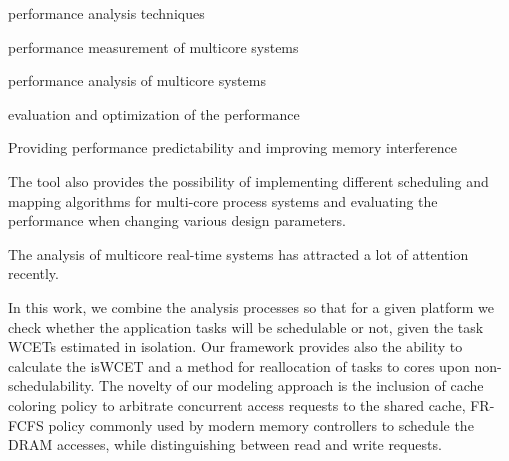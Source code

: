 \label{sec:relatedwork}

\cite{10.1109/MS.2005.102} performance analysis techniques 

\cite{Rakhee2014} performance measurement of multicore systems

\cite{DBLP:journals/corr/TeodoroKAKFS15} performance analysis of multicore systems

\cite{5762713} evaluation and optimization of the performance

\cite{Subramanian13} Providing performance predictability and improving memory interference 

\cite{SHARMA2014544} The tool also provides the possibility of implementing different scheduling and mapping algorithms for multi-core process systems and evaluating the performance when changing various design parameters.



The analysis of multicore real-time systems has attracted a lot of attention recently. 

In this work, we combine the analysis processes so that for a given platform we check whether the application tasks will be schedulable or not, given the task WCETs estimated in isolation. Our framework provides also the ability to calculate the isWCET and a method for reallocation of tasks to cores upon non-schedulability. 
The novelty of our modeling approach is the inclusion of cache coloring policy \cite{Hyoseung13} to arbitrate concurrent access requests to the shared cache, FR-FCFS policy \cite{Rixner2000,Nesbit2006,Kim14} commonly used by modern memory controllers to schedule the DRAM accesses, while distinguishing between read and write requests. 

